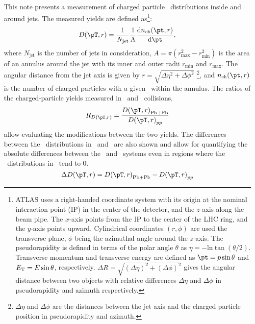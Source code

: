 This note presents a measurement of charged particle \pt\ distributions inside and around jets. The measured yields are defined as\footnote{ATLAS uses a right-handed coordinate system with its origin at the nominal interaction point (IP) in the center of the detector, and the $z$-axis along the beam pipe. The $x$-axis points from the IP to the center of the LHC ring, and the $y$-axis points upward. Cylindrical coordinates $(r, \phi)$ are used the transverse plane, $\phi$ being the azimuthal angle around the $z$-axis. The pseudorapidity is defined in terms of the polar angle $\theta$ as $\eta = - \text{ln} \tan (\theta/2)$. Transverse momentum and transverse energy are defined as $\pt = p \sin\theta$ and $\mbox{$E_{\mathrm{T}}$} = E \sin\theta$, respectively. $\Delta R = \sqrt{(\Delta \eta )^2 + (\Delta \phi)^2}$ gives the angular distance between two objects with relative differences $\Delta \eta$ and $\Delta \phi$ in pseudorapidity and azimuth respectively.}:
  \begin{equation}
  \Dptr = \frac{1}{N_{\mathrm{jet}}} \frac{1}{\mathrm{A}} \frac{\mathrm{d} n_{\mathrm{ch}} (\pt, r)}{\mathrm{d} \pt},
\end{equation}
where $N_{\mathrm{jet}}$ is the number of jets in consideration, $A = \pi (r_{\mathrm{max}}^2 - r_{\mathrm{min}}^2) $ is the area of an annulus around the jet with its inner and outer radii $r_{\mathrm{min}}$ and $r_{\mathrm{max}}$. The angular distance from the jet axis is given by $r = \sqrt{\Delta \eta^2 + \Delta \phi^2}$ \footnote{$\Delta \eta$ and $\Delta \phi$ are the distances between the jet axis and the charged particle position in pseudorapidity and azimuth.}, and $n_{\mathrm{ch}}(\pt, r)$ is the number of charged particles with a given \pt\ within the annulus. The ratios of the charged-particle yields measured in \pbpb\ and \pp\ collisions,
\begin{equation}
   \RDptr = \frac{\Dptr_\mathrm{Pb+Pb}}{\Dptr_{pp}}
   \label{eq:rdptr}
\end{equation}
allow evaluating the modifications between the two yields. The differences between the \Dptr\ distributions in \pbpb\ and \pp\ are also shown and allow for quantifying the absolute differences between the \pbpb\ and \pp\ systems even in regions where the \Dptr\ distributions in \pp\ tend to 0.
\begin{equation}
   \Delta \Dptr = \Dptr_\mathrm{Pb+Pb} - \Dptr_{pp}
   \label{eq:deltadptr}
\end{equation}

